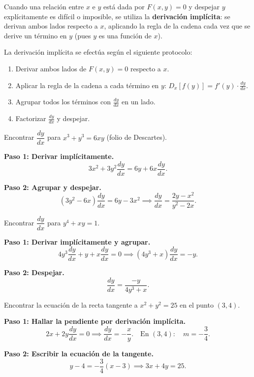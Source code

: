 Cuando una relación entre $x$ e $y$ está dada por $F(x,y)=0$ y despejar $y$ explícitamente es difícil o imposible, se utiliza la \textbf{derivación implícita}: se derivan ambos lados respecto a $x$, aplicando la regla de la cadena cada vez que se derive un término en $y$
(pues $y$ es una función de $x$).

\begin{rem} La derivación implícita se efectúa según el siguiente protocolo:
\begin{enumerate}
    \item Derivar ambos lados de $F(x,y)=0$ respecto a $x$.
    \item Aplicar la regla de la cadena a cada término en $y$:
    $D_x[f(y)] = f'(y)\cdot\frac{dy}{dx}$.
    \item Agrupar todos los términos con $\frac{dy}{dx}$ en un lado.
    \item Factorizar $\frac{dy}{dx}$ y despejar.
\end{enumerate}
\end{rem}

\begin{example}
Encontrar $\dfrac{dy}{dx}$ para $x^3+y^3 = 6xy$ (folio de Descartes).

\begin{myproof}

\textbf{Paso 1: Derivar implícitamente.}
\[
3x^2 + 3y^2\frac{dy}{dx} = 6y + 6x\frac{dy}{dx}.
\]

\textbf{Paso 2: Agrupar y despejar.}
\[
(3y^2-6x)\frac{dy}{dx} = 6y-3x^2
\implies
\boxed{\frac{dy}{dx} = \frac{2y-x^2}{y^2-2x}.}
\]
\end{myproof}
\end{example}

\begin{example}[Derivación implícita: $y^4+xy=1$]
Encontrar $\dfrac{dy}{dx}$ para $y^4+xy = 1$.

\begin{myproof}

\textbf{Paso 1: Derivar implícitamente y agrupar.}
\[
4y^3\frac{dy}{dx} + y + x\frac{dy}{dx} = 0
\implies
(4y^3+x)\frac{dy}{dx} = -y.
\]

\textbf{Paso 2: Despejar.}
\[
\boxed{\frac{dy}{dx} = \frac{-y}{4y^3+x}.}
\]
\end{myproof}
\end{example}

\begin{example}
Encontrar la ecuación de la recta tangente a $x^2+y^2=25$ en el punto $(3,4)$.

\begin{myproof}

\textbf{Paso 1: Hallar la pendiente por derivación implícita.}
\[
2x+2y\frac{dy}{dx}=0 \implies \frac{dy}{dx}=-\frac{x}{y}.
\quad\text{En }(3,4):\quad m = -\frac{3}{4}.
\]

\textbf{Paso 2: Escribir la ecuación de la tangente.}
\[
y-4 = -\frac{3}{4}(x-3) \implies \boxed{3x+4y = 25.}
\]
\end{myproof}
\end{example}

